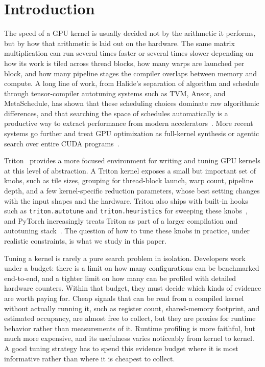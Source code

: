 \section{Introduction}

The speed of a GPU kernel is usually decided not by the arithmetic it performs, but by how that arithmetic is laid out on the hardware. The same matrix multiplication can run several times faster or several times slower depending on how its work is tiled across thread blocks, how many warps are launched per block, and how many pipeline stages the compiler overlaps between memory and compute. A long line of work, from Halide's separation of algorithm and schedule through tensor-compiler autotuning systems such as TVM, Ansor, and MetaSchedule, has shown that these scheduling choices dominate raw algorithmic differences, and that searching the space of schedules automatically is a productive way to extract performance from modern accelerators~\citep{ragankelley2012halide,mullapudi2016halide,adams2019halide,chen2018tvm,zheng2020ansor,chen2018learningtensor,shao2022metaschedule,zheng2022tensorir}. More recent systems go further and treat GPU optimization as full-kernel synthesis or agentic search over entire CUDA programs~\citep{dai2026cudaagent}.

Triton~\citep{tillet2019triton,openai2021triton} provides a more focused environment for writing and tuning GPU kernels at this level of abstraction. A Triton kernel exposes a small but important set of knobs, such as tile sizes, grouping for thread-block launch, warp count, pipeline depth, and a few kernel-specific reduction parameters, whose best setting changes with the input shapes and the hardware. Triton also ships with built-in hooks such as \texttt{triton.autotune} and \texttt{triton.heuristics} for sweeping these knobs~\citep{tritondocsautotune,tritondocsheuristics}, and PyTorch increasingly treats Triton as part of a larger compilation and autotuning stack~\citep{pytorchcompile2026,pytorchtriton2026}. The question of how to tune these knobs in practice, under realistic constraints, is what we study in this paper.

Tuning a kernel is rarely a pure search problem in isolation. Developers work under a budget: there is a limit on how many configurations can be benchmarked end-to-end, and a tighter limit on how many can be profiled with detailed hardware counters. Within that budget, they must decide which kinds of evidence are worth paying for. Cheap signals that can be read from a compiled kernel without actually running it, such as register count, shared-memory footprint, and estimated occupancy, are almost free to collect, but they are proxies for runtime behavior rather than measurements of it. Runtime profiling is more faithful, but much more expensive, and its usefulness varies noticeably from kernel to kernel. A good tuning strategy has to spend this evidence budget where it is most informative rather than where it is cheapest to collect.

